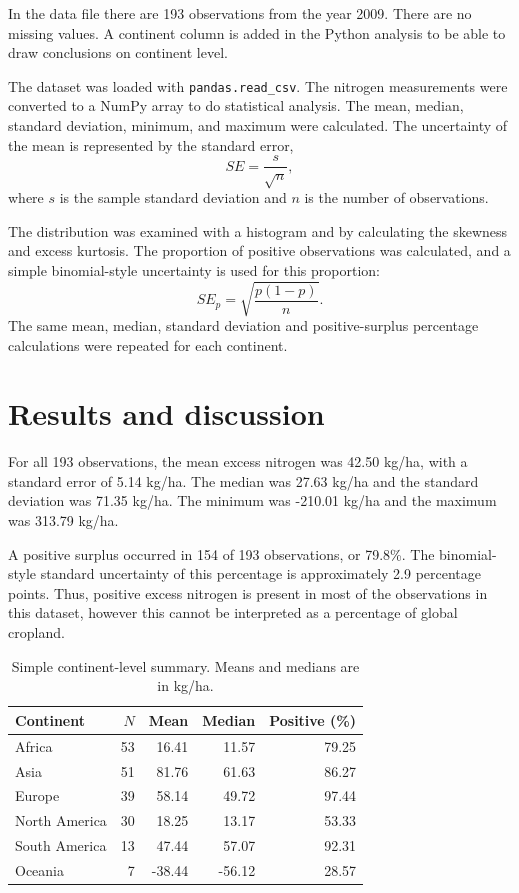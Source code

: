 \documentclass{article}
\begin{document}
In the data file there are 193 observations from the year 2009. There are no missing values. A continent column is added in the Python analysis to be able to draw conclusions on continent level.
 
The dataset was loaded with \texttt{pandas.read\_csv}. The nitrogen measurements were converted to a NumPy array to do statistical analysis. The mean, median, standard deviation, minimum, and maximum were calculated. The uncertainty of the mean is represented by the standard error,
\[
SE = \frac{s}{\sqrt{n}},
\]
where $s$ is the sample standard deviation and $n$ is the number of observations.
 
The distribution was examined with a histogram and by calculating the skewness and excess kurtosis. The proportion of positive observations was calculated, and a simple binomial-style uncertainty is used for this proportion:
\[
SE_p = \sqrt{\frac{p(1-p)}{n}}.
\]
The same mean, median, standard deviation and positive-surplus percentage calculations were repeated for each continent.
 
\section*{Results and discussion}
For all 193 observations, the mean excess nitrogen was 42.50 kg/ha, with a standard error of 5.14 kg/ha. The median was 27.63 kg/ha and the standard deviation was 71.35 kg/ha. The minimum was -210.01 kg/ha and the maximum was 313.79 kg/ha.
 
A positive surplus occurred in 154 of 193 observations, or 79.8\%. The binomial-style standard uncertainty of this percentage is approximately 2.9 percentage points. Thus, positive excess nitrogen is present in most of the observations in this dataset, however this cannot be interpreted as a percentage of global cropland.
 
\begin{table}[H]
\centering
\small
\begin{tabular}{lrrrr}
\toprule
Continent & $N$ & Mean & Median & Positive (\%)\\
\midrule
Africa & 53 & 16.41 & 11.57 & 79.25\\
Asia & 51 & 81.76 & 61.63 & 86.27\\
Europe & 39 & 58.14 & 49.72 & 97.44\\
North America & 30 & 18.25 & 13.17 & 53.33\\
South America & 13 & 47.44 & 57.07 & 92.31\\
Oceania & 7 & -38.44 & -56.12 & 28.57\\
\bottomrule
\end{tabular}
\caption{Simple continent-level summary. Means and medians are in kg/ha.}
\end{table}
 
\end{document}
